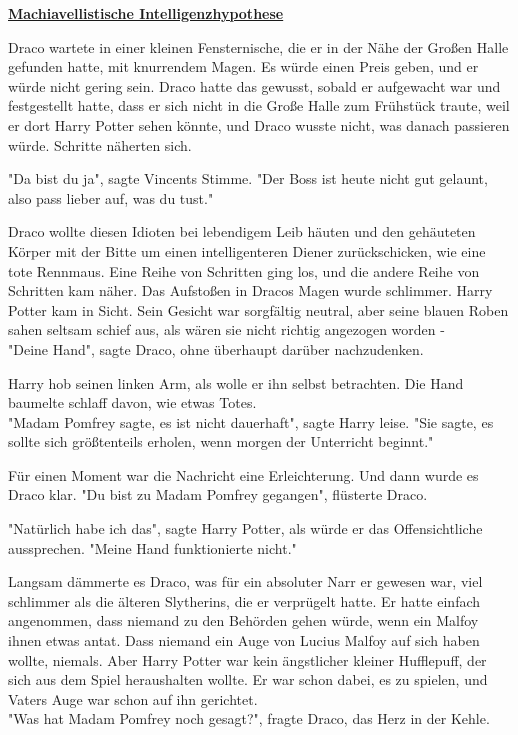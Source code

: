 

\hypertarget{machiavellistische-intelligenzhypothese}{%

\textbf{\uline{Machiavellistische Intelligenzhypothese}}

Draco wartete in einer kleinen Fensternische, die er in der Nähe der Großen Halle gefunden hatte, mit knurrendem Magen. Es würde einen Preis geben, und er würde nicht gering sein. Draco hatte das gewusst, sobald er aufgewacht war und festgestellt hatte, dass er sich nicht in die Große Halle zum Frühstück traute, weil er dort Harry Potter sehen könnte, und Draco wusste nicht, was danach passieren würde. Schritte näherten sich.

"Da bist du ja", sagte Vincents Stimme. "Der Boss ist heute nicht gut gelaunt, also pass lieber auf, was du tust."

Draco wollte diesen Idioten bei lebendigem Leib häuten und den gehäuteten Körper mit der Bitte um einen intelligenteren Diener zurückschicken, wie eine tote Rennmaus. Eine Reihe von Schritten ging los, und die andere Reihe von Schritten kam näher. Das Aufstoßen in Dracos Magen wurde schlimmer. Harry Potter kam in Sicht. Sein Gesicht war sorgfältig neutral, aber seine blauen Roben sahen seltsam schief aus, als wären sie nicht richtig angezogen worden -\\ "Deine Hand", sagte Draco, ohne überhaupt darüber nachzudenken.

Harry hob seinen linken Arm, als wolle er ihn selbst betrachten. Die Hand baumelte schlaff davon, wie etwas Totes.\\ "Madam Pomfrey sagte, es ist nicht dauerhaft", sagte Harry leise. "Sie sagte, es sollte sich größtenteils erholen, wenn morgen der Unterricht beginnt."

Für einen Moment war die Nachricht eine Erleichterung. Und dann wurde es Draco klar. "Du bist zu Madam Pomfrey gegangen", flüsterte Draco.

"Natürlich habe ich das", sagte Harry Potter, als würde er das Offensichtliche aussprechen. "Meine Hand funktionierte nicht."

Langsam dämmerte es Draco, was für ein absoluter Narr er gewesen war, viel schlimmer als die älteren Slytherins, die er verprügelt hatte. Er hatte einfach angenommen, dass niemand zu den Behörden gehen würde, wenn ein Malfoy ihnen etwas antat. Dass niemand ein Auge von Lucius Malfoy auf sich haben wollte, niemals. Aber Harry Potter war kein ängstlicher kleiner Hufflepuff, der sich aus dem Spiel heraushalten wollte. Er war schon dabei, es zu spielen, und Vaters Auge war schon auf ihn gerichtet.\\ "Was hat Madam Pomfrey noch gesagt?", fragte Draco, das Herz in der Kehle.

}
